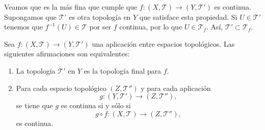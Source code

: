 Veamos que es la más fina que cumple que $\displaystyle f : \left(X, \mathcal{T}\right) \to \left(Y, \mathcal{T}'\right) $ es continua. Supongamos que $\displaystyle \mathcal{T}' $ es otra topología en $\displaystyle Y $ que satisface esta propiedad. Si $\displaystyle U \in \mathcal{T}' $ tenemos que $\displaystyle f^{-1}\left(U\right)\in \mathcal{T} $ por ser $\displaystyle f $ continua, por lo que $\displaystyle U \in \mathcal{T}_{f} $. Así, $\displaystyle \mathcal{T}'\subset \mathcal{T}_{f} $.
\begin{prop}
	Sea $\displaystyle f : \left(X, \mathcal{T}\right)\to \left(Y, \mathcal{T}'\right) $ una aplicación entre espacios topológicos. Las siguientes afirmaciones son equivalentes:
	\begin{enumerate}
	\item La topología $\displaystyle \mathcal{T}' $ en $\displaystyle Y $ es la topología final para $\displaystyle f $. 
	\item Para cada espacio topológico $\displaystyle \left(Z, \mathcal{T}''\right) $ y para cada aplicación 
		\[g : \left(Y, \mathcal{T}'\right)\to \left(Z, \mathcal{T}''\right), \]
		se tiene que $\displaystyle g $ es continua si y sólo si 
		\[g\circ f : \left(X, \mathcal{T}\right)\to \left(Z, \mathcal{T}''\right) ,\]
		es continua.
	\end{enumerate}
\end{prop}
